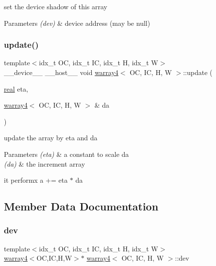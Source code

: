 set the device shadow of this array 


\begin{DoxyParams}{Parameters}
{\em (dev)} & device address (may be null) \\
\hline
\end{DoxyParams}
\mbox{\label{structwarray4_a6885db5ce025b11a44bdbe62c78166b2}} 
\subsubsection{\texorpdfstring{update()}{update()}}
{\footnotesize\ttfamily template$<$idx\+\_\+t OC, idx\+\_\+t IC, idx\+\_\+t H, idx\+\_\+t W$>$ \\
\+\_\+\+\_\+device\+\_\+\+\_\+ \+\_\+\+\_\+host\+\_\+\+\_\+ void \hyperlink{structwarray4}{warray4}$<$ OC, IC, H, W $>$\+::update (\begin{DoxyParamCaption}\item[{\hyperlink{vgg__util_8h_a1082d08aaa761215ec83e7149f27ad16}{real}}]{eta,  }\item[{\hyperlink{structwarray4}{warray4}$<$ OC, IC, H, W $>$ \&}]{da }\end{DoxyParamCaption})\hspace{0.3cm}{\ttfamily [inline]}}



update the array by eta and da 


\begin{DoxyParams}{Parameters}
{\em (eta)} & a constant to scale da \\
\hline
{\em (da)} & the increment array\\
\hline
\end{DoxyParams}
it performx a += eta $\ast$ da 

\subsection{Member Data Documentation}
\mbox{\label{structwarray4_a6ee2499ec6fa4a631652d4752905a648}} 
\subsubsection{\texorpdfstring{dev}{dev}}
{\footnotesize\ttfamily template$<$idx\+\_\+t OC, idx\+\_\+t IC, idx\+\_\+t H, idx\+\_\+t W$>$ \\
\hyperlink{structwarray4}{warray4}$<$OC,IC,H,W$>$$\ast$ \hyperlink{structwarray4}{warray4}$<$ OC, IC, H, W $>$\+::dev}


